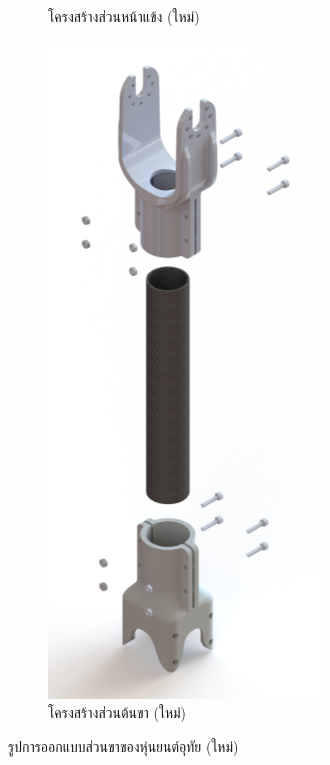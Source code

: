 \begin{figure}[!ht]
\begin{subfigure}[b]{0.3\linewidth}
      \caption{โครงสร้างส่วนหน้าแข้ง (ใหม่)}
    \end{subfigure}
    \begin{subfigure}[b]{0.3\linewidth}
      \includegraphics[width=\linewidth]{chapter4/images/carb_thigh.PNG}
      \caption{โครงสร้างส่วนต้นขา (ใหม่)}
    \end{subfigure}
    \caption{รูปการออกแบบส่วนขาของหุ่นยนต์อุทัย (ใหม่)}
    \label{fig:newleg}
  \end{figure}


